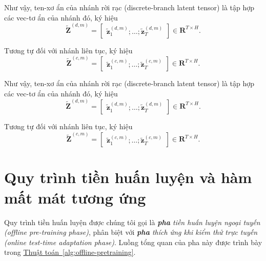 Như vậy, ten-xơ ẩn của nhánh rời rạc (discrete-branch latent tensor) là tập hợp các vec-tơ ẩn của nhánh đó, ký hiệu
\begin{equation}
\widetilde{\mathbf{Z}}^{(d,m)}
=
\begin{bmatrix}
\widetilde{\mathbf{z}}^{(d,m)}_{1};
\ldots;
\widetilde{\mathbf{z}}^{(d,m)}_{T}
\end{bmatrix}
\in \mathbf{R}^{T\times H}.
\end{equation}

Tương tự đối với nhánh liên tục, ký hiệu
\begin{equation}
\widetilde{\mathbf{Z}}^{(c,m)}
=
\begin{bmatrix}
\widetilde{\mathbf{z}}^{(c,m)}_{1};
\ldots;
\widetilde{\mathbf{z}}^{(c,m)}_{T}
\end{bmatrix}
\in \mathbf{R}^{T\times H}.
\end{equation}


Như vậy, ten-xơ ẩn của nhánh rời rạc (discrete-branch latent tensor) là tập hợp các vec-tơ ẩn của nhánh đó, ký hiệu
\begin{equation}
\widetilde{\mathbf{Z}}^{(d,m)}
=
\begin{bmatrix}
\widetilde{\mathbf{z}}^{(d,m)}_{1};
\ldots;
\widetilde{\mathbf{z}}^{(d,m)}_{T}
\end{bmatrix}
\in \mathbf{R}^{T\times H}.
\end{equation}

Tương tự đối với nhánh liên tục, ký hiệu
\begin{equation}
\widetilde{\mathbf{Z}}^{(c,m)}
=
\begin{bmatrix}
\widetilde{\mathbf{z}}^{(c,m)}_{1};
\ldots;
\widetilde{\mathbf{z}}^{(c,m)}_{T}
\end{bmatrix}
\in \mathbf{R}^{T\times H}.
\end{equation}

\section{Quy trình tiền huấn luyện và hàm mất mát tương ứng}
\label{section:pre-training}

Quy trình tiền huấn luyện được chúng tôi gọi là \textit{\textbf{pha} tiền huấn luyện ngoại tuyến (offline pre-training phase)}, phân biệt với \textit{\textbf{pha} thích ứng khi kiểm thử trực tuyến (online test-time adaptation phase)}. Luồng tổng quan của pha này được trình bày trong \hyperref[alg:offline-pretraining]{Thuật toán~\ref*{alg:offline-pretraining}}.

